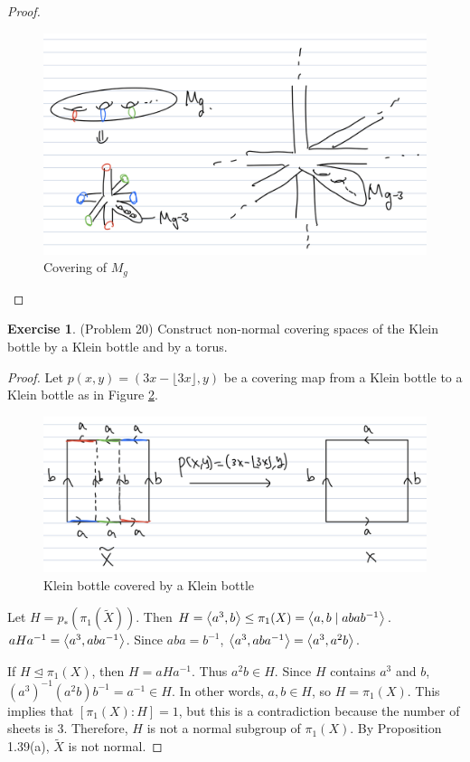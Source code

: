 \documentclass[12pt, psamsfonts]{amsart}
\theoremstyle{definition}
\newtheorem*{exer}{Exercise}
\theoremstyle{remark}
\numberwithin{equation}{section}
\begin{document}
\begin{proof}
  \begin{figure}
    \includegraphics[width=.5\linewidth]{covering_mg.jpeg}
    \caption{Covering of $M_g$}
    \label{fig:covering_mg}
  \end{figure}

\end{proof}

\begin{exer}{(Problem 20)}
  Construct non-normal covering spaces of the Klein bottle by a Klein bottle and by a torus.
\end{exer}

\begin{proof}
  Let $p(x, y) = (3x - \lfloor 3x \rfloor, y)$ be a covering map from a Klein bottle to a Klein bottle as in Figure \ref{fig:problem20_klein_by_klein}.

  \begin{figure}
    \includegraphics[width=.5\linewidth]{problem20_klein_by_klein.jpeg}
    \caption{Klein bottle covered by a Klein bottle}
    \label{fig:problem20_klein_by_klein}
  \end{figure}

  Let $H = p_*(\pi_1(\tilde{X}))$.
  Then $H = \ev{a^3, b} \leq \pi_1(X) = \ev{ a, b \mid abab^{-1} }$.
  $aHa^{-1} = \ev{a^3, aba^{-1}}$.
  Since $aba = b^{-1}$, $\ev{a^3, aba^{-1}} = \ev{a^3, a^2b}$.

  If $H \trianglelefteq \pi_1(X)$, then $H = aHa^{-1}$.
  Thus $a^2b \in H$.
  Since $H$ contains $a^3$ and $b$, $(a^3)^{-1}(a^2b)b^{-1} = a^{-1} \in H$.
  In other words, $a, b \in H$, so $H = \pi_1(X)$.
  This implies that $[\pi_1(X):H] = 1$, but this is a contradiction because the number of sheets is 3.
  Therefore, $H$ is not a normal subgroup of $\pi_1(X)$.
  By Proposition 1.39(a), $\tilde{X}$ is not normal.
\end{proof}
\end{document}
